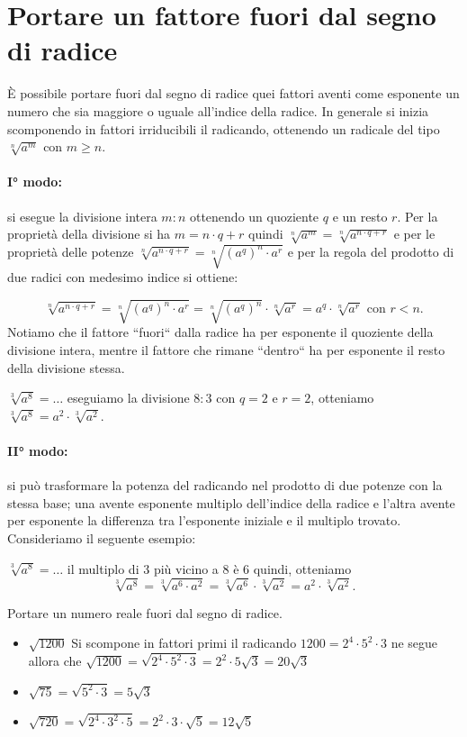 \section{Portare un fattore fuori dal segno di radice}
\label{sec:radici_portare_fuori}

È possibile portare fuori dal segno di radice quei fattori aventi come 
esponente un numero che sia maggiore o uguale all'indice della radice. 
In generale si inizia scomponendo in fattori irriducibili il radicando, 
ottenendo un radicale del tipo $\sqrt[n]{a^m}$ con $m\ge n$.

\paragraph{I° modo:} si esegue la divisione intera $m:n$ ottenendo un 
quoziente $q$ e un resto $r$. Per la proprietà della divisione si 
ha $m=n\cdot q+r$ quindi $\sqrt[n]{a^m}=\sqrt[n]{a^{n\cdot q+r}}$ 
e per le proprietà delle potenze 
$\sqrt[n]{a^{n\cdot q+r}}=\sqrt[n]{(a^q)^n\cdot a^r}$ 
e per la regola del prodotto di due radici con medesimo indice si ottiene:

\[\sqrt[n]{a^{n\cdot q+r}}= \sqrt[n]{(a^q)^n\cdot a^r}=
  \sqrt[n]{(a^q)^n}\cdot \sqrt[n]{a^r}=
  a^q\cdot \sqrt[n]{a^r}\text{ con } r<n.\]
Notiamo che il fattore ``fuori`` dalla radice ha per esponente il quoziente 
della divisione intera, mentre il fattore che rimane ``dentro`` ha per 
esponente il resto della divisione stessa.

 $\sqrt[3]{a^8}=\ldots $ eseguiamo la divisione $8:3$ con $q=2$ e $r=2$, 
 otteniamo $\sqrt[3]{a^8}=a^2\cdot \sqrt[3]{a^2}$.

\paragraph{II° modo:} si può trasformare la potenza del radicando nel 
prodotto di due potenze con la stessa base; una avente esponente multiplo 
dell'indice della radice e l'altra avente per esponente la differenza tra 
l'esponente iniziale e il multiplo trovato. Consideriamo il seguente esempio:

 $\sqrt[3]{a^8}=\ldots $ il multiplo di $3$ più vicino a $8$ è $6$ quindi, 
 otteniamo 
\[\sqrt[3]{a^8}=\sqrt[3]{a^6\cdot a^2}=\sqrt[3]{a^6}\cdot \sqrt[3]{a^2}=
  a^2\cdot \sqrt[3]{a^2}.\]

\begin{exrig}
 \begin{esempio}
 Portare un numero reale fuori dal segno di radice.
\begin{itemize}
 \item $\sqrt{1200}$ Si scompone in fattori primi il radicando 
       $1200=2^4\cdot 5^2\cdot 3$ ne segue allora che 
       $\sqrt{1200}=\sqrt{2^4\cdot 5^2\cdot 3}=2^2\cdot 5\sqrt 3=20\sqrt 3$
 \item $\sqrt{75}=\sqrt{5^2\cdot 3}=5\sqrt 3$
 \item $\sqrt{720}=\sqrt{2^4\cdot 3^2\cdot 5}=
        2^2\cdot 3\cdot \sqrt 5=12\sqrt 5$
\end{itemize}
 \end{esempio}
\end{exrig}

